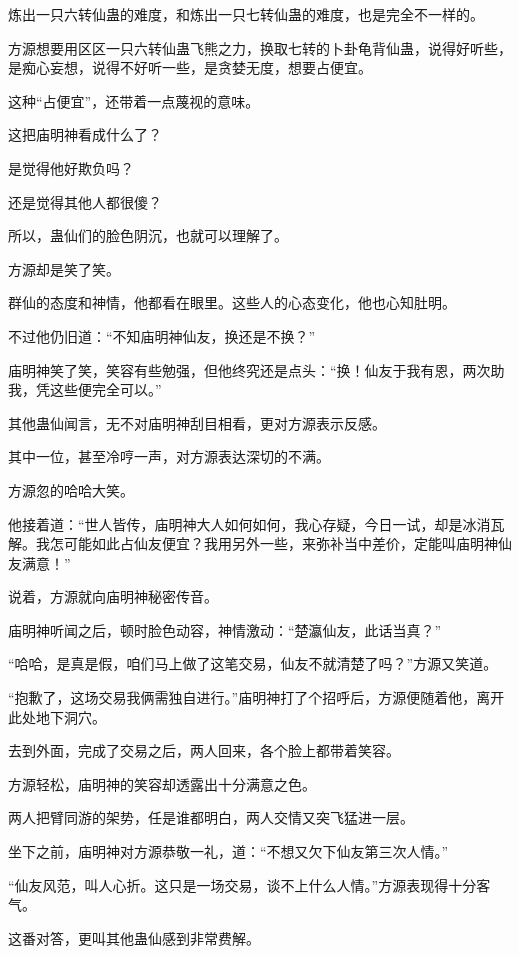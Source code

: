 
\begin{this_body}

炼出一只六转仙蛊的难度，和炼出一只七转仙蛊的难度，也是完全不一样的。

方源想要用区区一只六转仙蛊飞熊之力，换取七转的卜卦龟背仙蛊，说得好听些，是痴心妄想，说得不好听一些，是贪婪无度，想要占便宜。

这种“占便宜”，还带着一点蔑视的意味。

这把庙明神看成什么了？

是觉得他好欺负吗？

还是觉得其他人都很傻？

所以，蛊仙们的脸色阴沉，也就可以理解了。

方源却是笑了笑。

群仙的态度和神情，他都看在眼里。这些人的心态变化，他也心知肚明。

不过他仍旧道：“不知庙明神仙友，换还是不换？”

庙明神笑了笑，笑容有些勉强，但他终究还是点头：“换！仙友于我有恩，两次助我，凭这些便完全可以。”

其他蛊仙闻言，无不对庙明神刮目相看，更对方源表示反感。

其中一位，甚至冷哼一声，对方源表达深切的不满。

方源忽的哈哈大笑。

他接着道：“世人皆传，庙明神大人如何如何，我心存疑，今日一试，却是冰消瓦解。我怎可能如此占仙友便宜？我用另外一些，来弥补当中差价，定能叫庙明神仙友满意！”

说着，方源就向庙明神秘密传音。

庙明神听闻之后，顿时脸色动容，神情激动：“楚瀛仙友，此话当真？”

“哈哈，是真是假，咱们马上做了这笔交易，仙友不就清楚了吗？”方源又笑道。

“抱歉了，这场交易我俩需独自进行。”庙明神打了个招呼后，方源便随着他，离开此处地下洞穴。

去到外面，完成了交易之后，两人回来，各个脸上都带着笑容。

方源轻松，庙明神的笑容却透露出十分满意之色。

两人把臂同游的架势，任是谁都明白，两人交情又突飞猛进一层。

坐下之前，庙明神对方源恭敬一礼，道：“不想又欠下仙友第三次人情。”

“仙友风范，叫人心折。这只是一场交易，谈不上什么人情。”方源表现得十分客气。

这番对答，更叫其他蛊仙感到非常费解。


\end{this_body}
